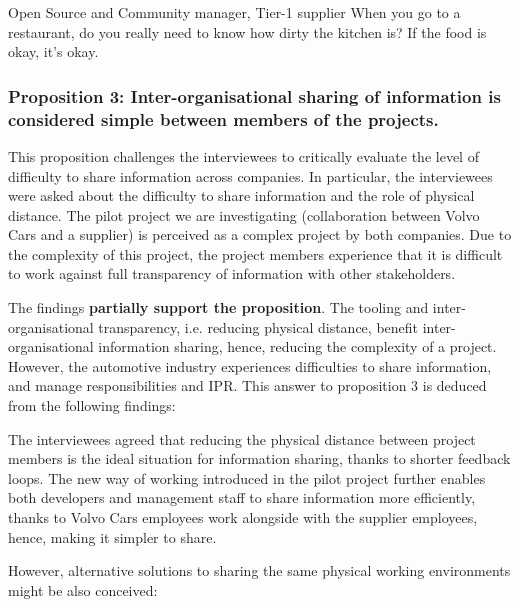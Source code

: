 \begin{aquote}{Open Source and Community manager, Tier-1 supplier}
When you go to a restaurant, do you really need to know how dirty the kitchen is? If the food is okay, it's okay.
\end{aquote}


\vspace{.2cm}
\subsubsection{Proposition 3: Inter-organisational sharing of information is considered simple between members of the projects.}

This proposition challenges the interviewees to critically evaluate the level of difficulty to share information across companies. In particular, the interviewees were asked about the difficulty to share information and the role of physical distance. The pilot project we are investigating (collaboration between Volvo Cars and a supplier) is perceived as a complex project by both companies. Due to the complexity of this project, the project members experience that it is difficult to work against full transparency of information with other stakeholders. 

The findings {\bf partially support the proposition}. The tooling and inter-organisational transparency, i.e. reducing physical distance, benefit inter-organisational information sharing, hence, reducing the complexity of a project. However, the automotive industry experiences difficulties to share information, and manage responsibilities and IPR. This answer to proposition 3 is deduced from the following findings:

 The interviewees agreed that reducing the physical distance between project members is the ideal situation for information sharing, thanks to shorter feedback loops. The new way of working introduced in the pilot project further enables both developers and management staff to share information more efficiently, thanks to Volvo Cars employees work alongside with the supplier employees, hence, making it simpler to share. 

However, alternative solutions to sharing the same physical working environments might be also conceived:

